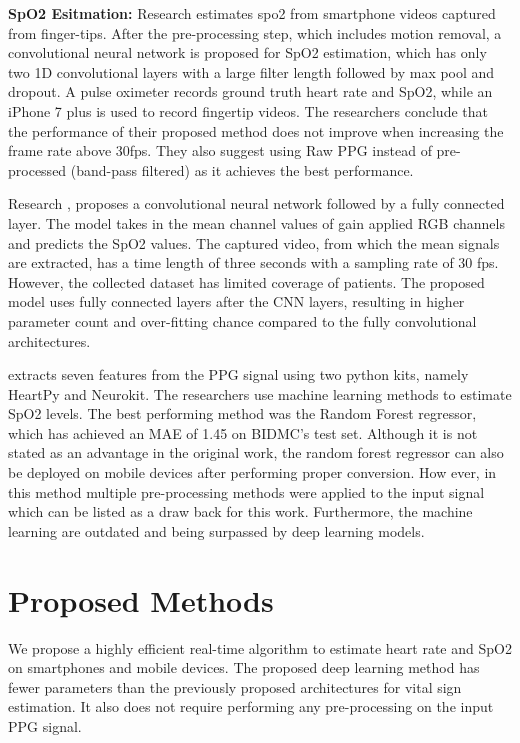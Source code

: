 \documentclass[conference]{IEEEtran}
\begin{document}
\textbf{SpO2 Esitmation:}
Research \cite{b13} estimates spo2 from smartphone videos captured from finger-tips. After the pre-processing step, which includes motion removal, a convolutional neural network is proposed for SpO2 estimation, which has only two 1D convolutional layers with a large filter length followed by max pool and dropout. A pulse oximeter records ground truth heart rate and SpO2, while an iPhone 7 plus is used to record fingertip videos. The researchers conclude that the performance of their proposed method does not improve when increasing the frame rate above 30fps. They also suggest using Raw PPG instead of pre-processed (band-pass filtered) as it achieves the best performance.

Research \cite{b14}, proposes a convolutional neural network followed by a fully connected layer. The model takes in the mean channel values of gain applied RGB channels and predicts the SpO2 values. The captured video, from which the mean signals are extracted, has a time length of three seconds with a sampling rate of 30 fps. However, the collected dataset has limited coverage of patients. The proposed model uses fully connected layers after the CNN layers, resulting in higher parameter count and over-fitting chance compared to the fully convolutional architectures.

\cite{b16} extracts seven features from the PPG signal using two python kits, namely HeartPy and Neurokit. The researchers use machine learning methods to estimate SpO2 levels. The best performing method was the Random Forest regressor, which has achieved an MAE of 1.45 on BIDMC's test set. Although it is not stated as an advantage in the original work, the random forest regressor can also be deployed on mobile devices after performing proper conversion. How ever, in this method multiple pre-processing methods were applied to the input signal which can be listed as a draw back for this work. Furthermore, the machine learning are outdated and being surpassed by deep learning models.

\section{Proposed Methods}
We propose a highly efficient real-time algorithm to estimate heart rate and SpO2 on smartphones and mobile devices. The proposed deep learning method has fewer parameters than the previously proposed architectures for vital sign estimation. It also does not require performing any pre-processing on the input PPG signal.
\end{document}
